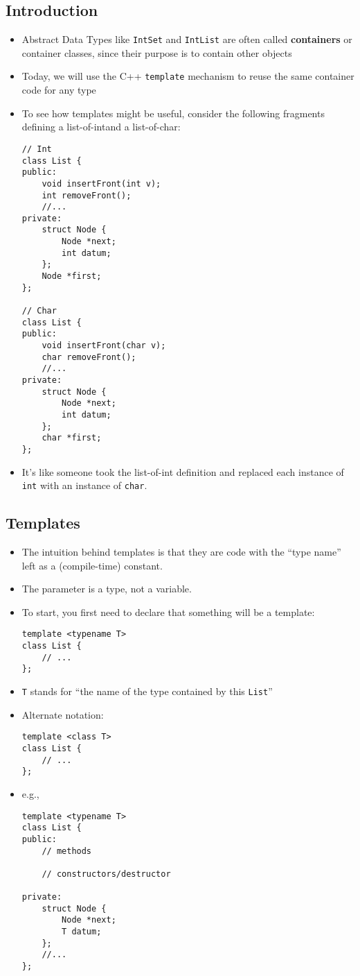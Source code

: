 \subsection{Introduction}
\begin{itemize}
	\item Abstract Data Types like \lstinline[style=C++]{IntSet} and \lstinline[style=C++]{IntList} are often called \textbf{containers} or container classes, since their purpose is to contain other objects
	\item Today, we will use the C++ \lstinline[style=C++]{template} mechanism to reuse the same container code for any type
	\item To see how templates might be useful, consider the following fragments defining a list-of-intand a list-of-char:
\begin{lstlisting}[style=C++]
// Int 
class List {
public:
	void insertFront(int v);
	int removeFront();
	//...
private:
	struct Node { 
		Node *next;
		int datum;
	};
	Node *first;
};

// Char 
class List {
public:
	void insertFront(char v);
	char removeFront();
	//...
private:
	struct Node { 
		Node *next;
		int datum;
	};
	char *first;
};
\end{lstlisting}
	\item It's like someone took the list-of-int definition and replaced each instance of \lstinline[style=C++]{int} with an instance of \lstinline[style=C++]{char}.
\end{itemize}

\subsection{Templates}
\begin{itemize}
	\item The intuition behind templates is that they are code with the ``type name'' left as a (compile-time) constant.
	\item The parameter is a type, not a variable.
	\item To start, you first need to declare that something will be a template:
\begin{lstlisting}[style=C++]
template <typename T>
class List {
	// ...
};
\end{lstlisting}
	\item \lstinline[style=C++]{T} stands for ``the name of the type contained by this \lstinline[style=C++]{List}''
	\item Alternate notation:
\begin{lstlisting}[style=C++]
template <class T>
class List {
	// ...
};
\end{lstlisting}
	\item e.g.,
\begin{lstlisting}[style=C++]
template <typename T>
class List {
public:
	// methods

	// constructors/destructor

private:
	struct Node {
		Node *next;
		T datum;
	};
	//...
};
\end{lstlisting}
\end{itemize}

